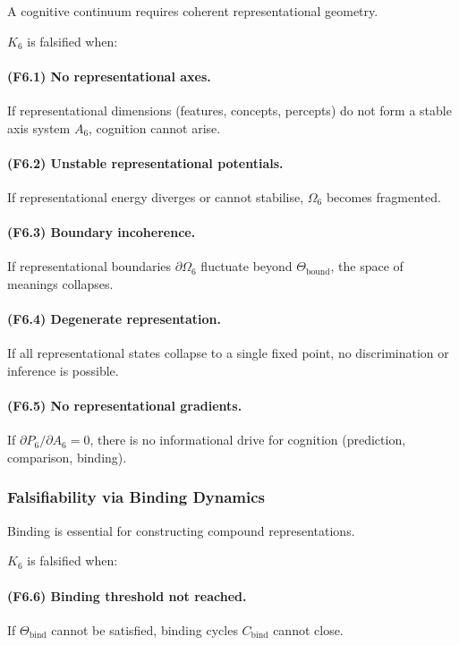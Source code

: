 A cognitive continuum requires coherent representational geometry.

$K_6$ is falsified when:

\paragraph{(F6.1) No representational axes.}
If representational dimensions (features, concepts, percepts)
do not form a stable axis system $A_6$,
cognition cannot arise.

\paragraph{(F6.2) Unstable representational potentials.}
If representational energy diverges or cannot stabilise,
$\Omega_6$ becomes fragmented.

\paragraph{(F6.3) Boundary incoherence.}
If representational boundaries $\partial\Omega_6$ fluctuate beyond
$\Theta_{\mathrm{bound}}$, the space of meanings collapses.

\paragraph{(F6.4) Degenerate representation.}
If all representational states collapse to a single fixed point,
no discrimination or inference is possible.

\paragraph{(F6.5) No representational gradients.}
If $\partial P_6 / \partial A_6 = 0$, there is no informational drive
for cognition (prediction, comparison, binding).



\subsubsection{Falsifiability via Binding Dynamics}

Binding is essential for constructing compound representations.

$K_6$ is falsified when:

\paragraph{(F6.6) Binding threshold not reached.}
If $\Theta_{\mathrm{bind}}$ cannot be satisfied,
binding cycles $C_{\mathrm{bind}}$ cannot close.


